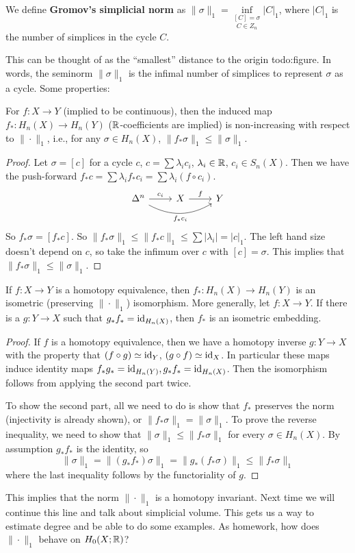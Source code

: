 \begin{definition}
    We define \textbf{Gromov's simplicial norm} as $\|\sigma\|_1= \underset{C \in Z_n }{\underset{[C]=\sigma}{\inf}} |C|_1$, where $|C|_1$ is the number of simplices in the cycle $C$.
\end{definition}
This can be thought of as the ``smallest'' distance to the origin {\color{red}todo:figure}. In words, the seminorm $\|\sigma\|_1$ is the infimal number of simplices to represent  $\sigma$ as a cycle. Some properties:
\begin{prop}[Functoriality]
   For $f \colon X \to Y$ (implied to be continuous), then the induced map $f_* \colon H_n (X) \to H_n \left( Y \right) $ ($\mathbb{R}$-coefficients are implied) is non-increasing with respect to $\|\cdot \|_1$, i.e., for any $\sigma \in H_n (X)$, $\|f_* \sigma\|_1 \leq \| \sigma\|_1$.
\end{prop}
\begin{proof}
    Let $\sigma=[c]$ for a cycle $c$, $c=\sum \lambda_i c_i $, $\lambda_i  \in \mathbb{R}$, $c_i  \in S_n (X)$. Then we have the push-forward $f_* c= \sum \lambda_i f_* c_i =\sum \lambda_i ( f \circ c_i )$. \[
    \begin{tikzcd}
\Delta^n \arrow[r, "c_i"] \arrow[rr, "f_*c_i"', bend right] & X \arrow[r, "f"] & Y
\end{tikzcd}
    \] So $f_* \sigma=[f_* c]$. So $\| f_* \sigma\|_1 \leq \|f_*c \|_1 \leq \sum|\lambda_i |=|c|_1$. The left hand size doesn't depend on $c$, so take the infimum over $c$ with $[c]=\sigma$. This implies that $\|f _*\sigma\|_1 \leq \| \sigma\|_1$.
\end{proof}
\begin{cor}[Invariance]
    If $f \colon X \to Y$ is a homotopy equivalence, then $f_* \colon H_n (X) \to H_n (Y)$ is an isometric (preserving $\| \cdot \|_1$) isomorphism. More generally, let $f \colon X \to Y$. If there is a  $g\colon Y \to X$ such that $g_* f_* =\operatorname{id} _{H_n (X)}$, then $f_*$ is an isometric embedding.
\end{cor}
\begin{proof}
    If $f$ is a homotopy equivalence, then we have a homotopy inverse $g \colon Y \to X$ with the property that $(f \circ g) \simeq \operatorname{id}_Y$, $(g \circ f) \simeq \operatorname{id}_X$. In particular these maps induce identity maps $f_*g_*=\operatorname{id} _{H_n (Y)}, g_* f_*=\operatorname{id} _{H_n (X)}$. Then the isomorphism follows from applying the second part twice.

    To show the second part, all we need to do is show that $f_*$ preserves the norm (injectivity is already shown), or $\| f_* \sigma\|_1=\|\sigma\|_1$. To prove the reverse inequality, we need to show that $\| \sigma\|_1 \leq \|f_* \sigma\|_1$ for every $\sigma \in H_n (X)$. By assumption $g_*f_*$ is the identity, so \[
        \| \sigma\|_1= \|(g_* f_*) \sigma\|_1=\| g_* (f_*\sigma)\|_1 \leq \| f_* \sigma\|_1
    \] where the last inequality follows by the functoriality of $g$.
\end{proof}
This implies that the norm $\|\cdot \|_1$ is a homotopy invariant. Next time we will continue this line and talk about simplicial volume. This gets us a way to estimate degree and be able to do some examples. As homework, how does $\|\cdot \|_1$ behave on $H_0(X;\mathbb{R})$?

